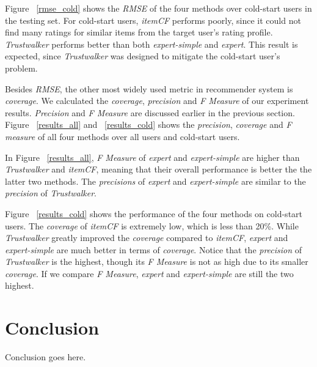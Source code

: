 \documentclass[12pt]{article}
\begin{document}
Figure ~\ref{rmse_cold} shows the \emph{RMSE} of the four methods over cold-start users in the testing set. For cold-start users, \emph{itemCF} performs poorly, since it could not find many ratings for similar items from the target user's rating profile. \emph{Trustwalker} performs better than both \emph{expert-simple} and \emph{expert}. This result is expected, since \emph{Trustwalker} was designed to mitigate the cold-start user's problem. 



Besides \emph{RMSE}, the other most widely used metric in recommender system is \emph{coverage}. We calculated the \emph{coverage}, \emph{precision} and \emph{F Measure} of our experiment results. \emph{Precision} and \emph{F Measure} are discussed earlier in the previous section. Figure ~\ref{results_all} and ~\ref{results_cold} shows the \emph{precision}, \emph{coverage} and \emph{F measure} of all four methods over all users and cold-start users. 

In Figure ~\ref{results_all}, \emph{F Measure} of \emph{expert} and \emph{expert-simple} are higher than \emph{Trustwalker} and \emph{itemCF}, meaning that their overall performance is better the the latter two methods. The \emph{precisions} of \emph{expert} and \emph{expert-simple} are similar to the \emph{precision} of \emph{Trustwalker}. 

Figure ~\ref{results_cold} shows the performance of the four methods on cold-start users. The \emph{coverage} of \emph{itemCF} is extremely low, which is less than 20\%. While \emph{Trustwalker} greatly improved the \emph{coverage} compared to \emph{itemCF}, \emph{expert} and \emph{expert-simple} are much better in terms of \emph{coverage}. Notice that the \emph{precision} of \emph{Trustwalker} is the highest, though its \emph{F Measure} is not as high due to its smaller \emph{coverage}. If we compare \emph{F Measure}, \emph{expert} and \emph{expert-simple} are still the two highest.

\section{Conclusion}
Conclusion goes here.



\end{document}
